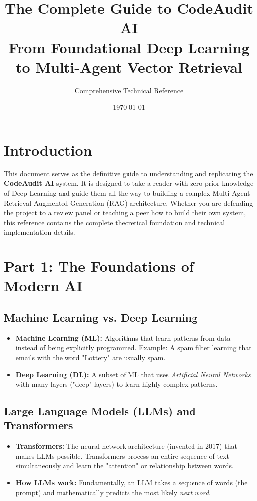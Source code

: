 \documentclass[12pt,a4paper]{article}
\title{\Huge \textbf{The Complete Guide to CodeAudit AI} \\ 
\Large From Foundational Deep Learning to Multi-Agent Vector Retrieval}
\author{Comprehensive Technical Reference}
\date{\today}
\begin{document}
\maketitle
\tableofcontents
\newpage

\section{Introduction}
This document serves as the definitive guide to understanding and replicating the \textbf{CodeAudit AI} system. It is designed to take a reader with zero prior knowledge of Deep Learning and guide them all the way to building a complex Multi-Agent Retrieval-Augmented Generation (RAG) architecture. Whether you are defending the project to a review panel or teaching a peer how to build their own system, this reference contains the complete theoretical foundation and technical implementation details.

\section{Part 1: The Foundations of Modern AI}

\subsection{Machine Learning vs. Deep Learning}
\begin{itemize}
    \item \textbf{Machine Learning (ML):} Algorithms that learn patterns from data instead of being explicitly programmed. Example: A spam filter learning that emails with the word "Lottery" are usually spam.
    \item \textbf{Deep Learning (DL):} A subset of ML that uses \textit{Artificial Neural Networks} with many layers ("deep" layers) to learn highly complex patterns.
\end{itemize}

\subsection{Large Language Models (LLMs) and Transformers}
\begin{itemize}
    \item \textbf{Transformers:} The neural network architecture (invented in 2017) that makes LLMs possible. Transformers process an entire sequence of text simultaneously and learn the "attention" or relationship between words.
    \item \textbf{How LLMs work:} Fundamentally, an LLM takes a sequence of words (the prompt) and mathematically predicts the most likely \textit{next word}.
\end{itemize}
\end{document}
